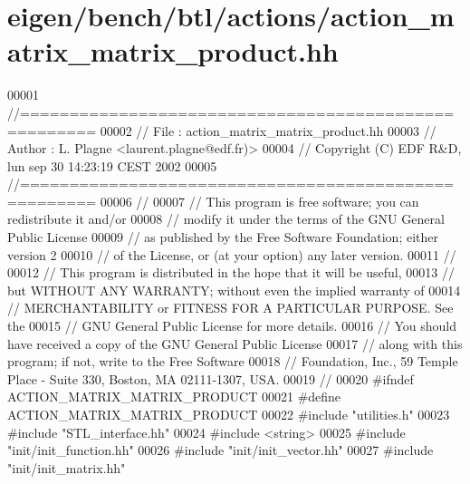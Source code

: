 \hypertarget{eigen_2bench_2btl_2actions_2action__matrix__matrix__product_8hh_source}{}\section{eigen/bench/btl/actions/action\+\_\+matrix\+\_\+matrix\+\_\+product.hh}
\label{eigen_2bench_2btl_2actions_2action__matrix__matrix__product_8hh_source}

\begin{DoxyCode}
00001 \textcolor{comment}{//=====================================================}
00002 \textcolor{comment}{// File   :  action\_matrix\_matrix\_product.hh}
00003 \textcolor{comment}{// Author :  L. Plagne <laurent.plagne@edf.fr)>}
00004 \textcolor{comment}{// Copyright (C) EDF R&D,  lun sep 30 14:23:19 CEST 2002}
00005 \textcolor{comment}{//=====================================================}
00006 \textcolor{comment}{//}
00007 \textcolor{comment}{// This program is free software; you can redistribute it and/or}
00008 \textcolor{comment}{// modify it under the terms of the GNU General Public License}
00009 \textcolor{comment}{// as published by the Free Software Foundation; either version 2}
00010 \textcolor{comment}{// of the License, or (at your option) any later version.}
00011 \textcolor{comment}{//}
00012 \textcolor{comment}{// This program is distributed in the hope that it will be useful,}
00013 \textcolor{comment}{// but WITHOUT ANY WARRANTY; without even the implied warranty of}
00014 \textcolor{comment}{// MERCHANTABILITY or FITNESS FOR A PARTICULAR PURPOSE.  See the}
00015 \textcolor{comment}{// GNU General Public License for more details.}
00016 \textcolor{comment}{// You should have received a copy of the GNU General Public License}
00017 \textcolor{comment}{// along with this program; if not, write to the Free Software}
00018 \textcolor{comment}{// Foundation, Inc., 59 Temple Place - Suite 330, Boston, MA  02111-1307, USA.}
00019 \textcolor{comment}{//}
00020 \textcolor{preprocessor}{#ifndef ACTION\_MATRIX\_MATRIX\_PRODUCT}
00021 \textcolor{preprocessor}{#define ACTION\_MATRIX\_MATRIX\_PRODUCT}
00022 \textcolor{preprocessor}{#include "utilities.h"}
00023 \textcolor{preprocessor}{#include "STL\_interface.hh"}
00024 \textcolor{preprocessor}{#include <string>}
00025 \textcolor{preprocessor}{#include "init/init\_function.hh"}
00026 \textcolor{preprocessor}{#include "init/init\_vector.hh"}
00027 \textcolor{preprocessor}{#include "init/init\_matrix.hh"}

\end{DoxyCode}
